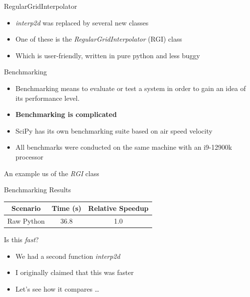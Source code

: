 \documentclass[12pt,xcolor=dvipsnames]{beamer}
\begin{document}
    \begin{frame}{RegularGridInterpolator}
        \begin{itemize}
            \item \textit{interp2d} was replaced by several new classes
            \item One of these is the \textit{RegularGridInterpolator} (RGI) class
            \item Which is user-friendly, written in pure python and less buggy
        \end{itemize}
    \end{frame}

    \begin{frame}{Benchmarking}
        \begin{itemize}
            \item Benchmarking means to evaluate or test a system in order to gain an idea of its performance level.
            \item \textbf{Benchmarking is complicated}
            \item SciPy has its own benchmarking suite based on air speed velocity
            \item All benchmarks were conducted on the same machine with an i9-12900k processor
        \end{itemize}
    \end{frame}

    \begin{frame}{An example us of the \textit{RGI} class}
        
    \end{frame}

    \begin{frame}{Benchmarking Results}
        \begin{center}
        \begin{tabular}{ | c | c | c | }
            \hline
            Scenario & Time (s) & Relative Speedup \\
            \hline
            Raw Python & 36.8 & 1.0 \\
            \hline
        \end{tabular}
        \end{center}
    \end{frame}

    \begin{frame}{Is this \textit{fast}?}
        \begin{itemize}
            \item We had a second function \textit{interp2d}
            \item I originally claimed that this was faster
            \item Let's see how it compares \ldots
        \end{itemize}
    \end{frame}
\end{document}
